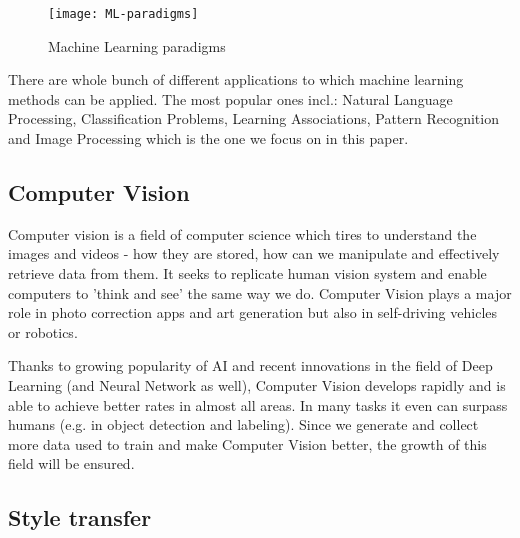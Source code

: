 \documentclass[../Main.tex]{subfiles}
\begin{document}
    \begin{figure}[h]
        \centering
        \texttt{[image: ML-paradigms]}
        \caption{Machine Learning paradigms}
        \label{fig:ML-paradigms}
    \end{figure}

\newpage
    There are whole bunch of different applications to which machine learning methods can be applied. The most popular ones incl.: Natural Language Processing, Classification Problems, Learning Associations, Pattern Recognition and Image Processing which is the one we focus on in this paper.

\subsection{Computer Vision}
    Computer vision is a field of computer science which tires to understand the images and videos - how they are stored, how can we manipulate and effectively retrieve data from them. It seeks to replicate human vision system and enable computers to 'think and see' the same way we do.  Computer Vision plays a major role in photo correction apps and art generation but also in self-driving vehicles or robotics.
    
    Thanks to growing popularity of AI and recent innovations in the field of Deep Learning (and Neural Network as well), Computer Vision develops rapidly and is able to achieve better rates in almost all areas. In many tasks it even can surpass humans (e.g. in object detection and labeling). Since we generate and collect more data used to train and make Computer Vision better, the growth of this field will be ensured.

\newpage
\subsection{Style transfer}
\end{document}
